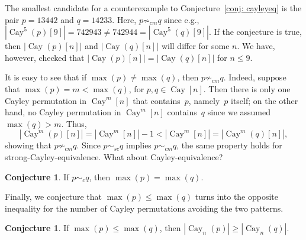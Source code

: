\documentclass[a4paper, 11pt]{article}
\DeclareMathOperator{\Cay}{Cay}
\theoremstyle{definition}
\newtheorem{conjecture}[theorem]{Conjecture}
\begin{document}
The smallest candidate for a counterexample to Conjecture~\ref{conj: cayleyeq}
is the pair $p=13442$ and $q=14233$. Here,
$p\not\sim_{cm} q$ since e.g.,
$|\Cay^5(p)[9]|=742943\neq 742944=|\Cay^5(q)[9]|$. If the conjecture is true, then
$|\Cay(p)[n]|$ and $|\Cay(q)[n]|$ will differ for some $n$. We have, however, checked that
$|\Cay(p)[n]|=|\Cay(q)[n]|$ for $n\le 9$.

It is easy to see that if $\max(p)\neq\max(q)$, then $p\not\sim_{cm}q$.
Indeed, suppose that $\max(p)=m<\max(q)$, for $p,q\in\Cay[n]$. Then there
is only one Cayley permutation in $\Cay^m[n]$ that contains~$p$, namely~$p$
itself; on the other hand, no Cayley permutation in $\Cay^m[n]$
contains~$q$ since we assumed $\max(q)>m$. Thus,
$$
|\Cay^m(p)[n]| = |\Cay^m[n]|-1 < |\Cay^m[n]| = |\Cay^m(q)[n]|,
$$
showing that $p\not\sim_{cm}q$. Since $p\sim_{sc}q$ implies
$p\sim_{cm}q$, the same property holds for strong-Cayley-equivalence.
What about Cayley-equivalence?

\begin{conjecture}
  If $p\sim_c q$, then $\max(p)=\max(q)$.
\end{conjecture}

Finally, we conjecture that $\max(p)\le\max(q)$ turns into the opposite
inequality for the number of Cayley permutations avoiding the two patterns.

\begin{conjecture}
If $\max(p)\leq \max(q)$, then $|\Cay_n(p)| \geq |\Cay_n(q)|$.
\end{conjecture}





\end{document}
